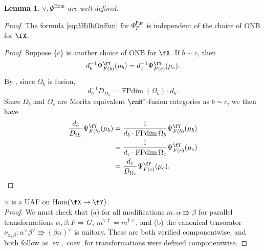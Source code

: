 \documentclass[12pt, reqno]{amsart}
\DeclareMathOperator{\coev}{coev}
\DeclareMathOperator{\ev}{ev}
\DeclareMathOperator{\FPdim}{FPdim}
\DeclareMathOperator{\Hom}{Hom}
\newcommand{\Fun}{\mathsf{Fun}}
\theoremstyle{plain}
\newtheorem{lem}[thm]{Lemma}
\theoremstyle{definition}
\begin{document}
\begin{lem}
$\vee, \Psi^{\Hom}$ are well-defined.
\end{lem}
\begin{proof}
\item[\underline{Step 1:}]
The formula \eqref{eq:3HilbOnFun} for $\Psi_F^\Fun$ is independent of the choice of ONB for $\fX$.
\begin{proof}
Suppose $\{c\}$ is another choice of ONB for $\fX$.
If $b\sim c$, then 
$$
d_b^{-1} \Psi^\fY_{F(b)}(\mu_b)
=
d_c^{-1} \Psi^\fY_{F(c)}(\mu_c).
$$
By \cite[p16, before (8)]{MR5078555}, since $\Omega_b$ is fusion,
$$
d_b^{-1} D_{\Omega_b}
=
\FPdim(\Omega_b)\cdot d_b.
$$
Since $\Omega_b$ and $\Omega_c$ 
are Morita equivalent $\rmH^*$-fusion categories
as $b\sim c$, we then have
\begin{align*}
\frac{d_b}{D_{\Omega_b}}
\Psi^\fY_{F(b)}(\mu_b)
&=
\frac{1}{d_b\cdot \FPdim \Omega_b}
\Psi^\fY_{F(b)}(\mu_b)
\\&=
\frac{1}{d_c\cdot \FPdim \Omega_{c}}
\Psi^\fY_{F(c)}(\mu_c)
\\&=
\frac{d_c}{D_{\Omega_c}}
\Psi^\fY_{F(c)}(\mu_c).
\qedhere
\end{align*}
\end{proof}

\item[\underline{Step 2:}]
$\vee$ is a UAF on $\Hom(\fX\to \fY)$.
\vspace*{.2cm}\\
\noindent\emph{Proof.}
We must check that 
(a) for all modifications $m\colon  \alpha\Rrightarrow \beta$ for parallel transformations $\alpha,\beta\colon  F\Rightarrow G$, $m^{\vee\dag}=m^{\dag\vee}$, 
and
(b) the canonical tensorator $\nu_{\alpha,\beta}\colon \alpha^\vee\beta^\vee\Rrightarrow (\beta\alpha)^\vee$
is unitary.
These are both verified componentwise, 
and both follow as $\ev,\coev$ for transformations were defined componentwise.
\end{proof}
\end{document}

